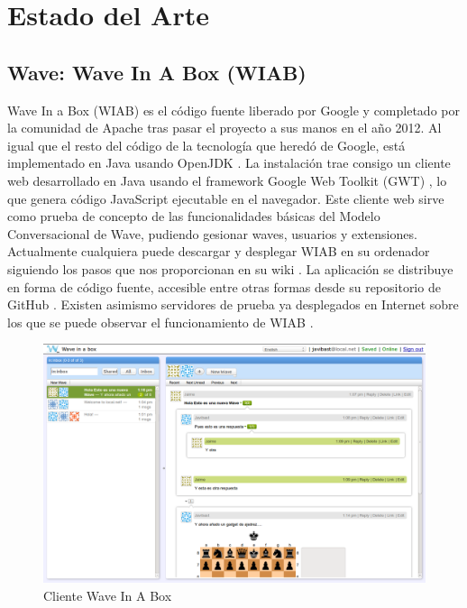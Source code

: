 \newpage
\thispagestyle{sectioned}
\chapter{Estado del Arte}

\section{Wave: Wave In A Box (WIAB)}\label{sec:wiab}
	    
	Wave In a Box (WIAB) \cite{ref:wave_in_a_box} es el código fuente liberado por Google y completado por la comunidad de Apache tras pasar el proyecto a sus manos en el año 2012. Al igual que el resto del código de la tecnología que heredó de Google, está implementado en Java usando OpenJDK \cite{ref:openjdk}. La instalación trae consigo un cliente web desarrollado en Java usando el framework Google Web Toolkit (GWT) \cite{ref:gwt}, lo que genera código JavaScript ejecutable en el navegador. Este cliente web sirve como prueba de concepto de las funcionalidades básicas del Modelo Conversacional de Wave, pudiendo gesionar waves, usuarios y extensiones. Actualmente cualquiera puede descargar y desplegar WIAB en su ordenador siguiendo los pasos que nos proporcionan en su wiki \cite{ref:wave_in_a_box_wiki}. La aplicación se distribuye en forma de código fuente, accesible entre otras formas desde su repositorio de GitHub \cite{ref:wave_in_a_box_github}. Existen asimismo servidores de prueba ya desplegados en Internet sobre los que se puede observar el funcionamiento de WIAB \cite{ref:wave_in_a_box_server}.
   		
	\begin{figure}[H]
      \centering
		\includegraphics[keepaspectratio, scale=0.3]{Media/Captures/WIAB_Server.png}
      \caption{Cliente Wave In A Box}
      \label{fig:wiab_client}
    \end{figure} 

